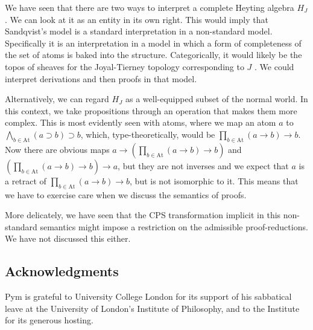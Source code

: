 \documentclass{sn-jnl}
\newcommand{\At}{\text{At}}
\begin{document}
We have seen that there are two ways to interpret a complete Heyting algebra $H_J$. We can look at it as an entity in its own right. This would imply that Sandqvist's model is a standard interpretation in a non-standard model. Specifically it is an interpretation in a model in which a form of completeness of the set of atoms is baked into the structure. Categorically, it would likely be the topos of sheaves for the Joyal-Tierney topology corresponding to $J$ \cite{MM1992}. We could interpret derivations and then proofs in that model. 

Alternatively, we can regard $H_J$ as a well-equipped subset of the normal world. In this context, we take propositions through an operation that makes them more complex. This is most evidently seen with atoms, where we map an atom $a$ to $\bigwedge_{b\in\At} (a\supset b)\supset b$, which, type-theoretically, would be
$\prod_{b\in\At} (a\to b)\to b$. Now there are obvious maps $a \longrightarrow (\prod_{b\in\At} (a\to b)\to b)$ and $(\prod_{b\in\At} (a\to b)\to b) \longrightarrow a$, but they are not inverses and we expect that $a$ is a retract of $\prod_{b\in\At} (a\to b)\to b$, but is not isomorphic to it. This means that we have to exercise care when we discuss the semantics of proofs. 

More delicately, we have seen that the CPS  transformation implicit in this non-standard semantics might impose a restriction on the admissible proof-reductions. We have not discussed this either. 

\subsection*{Acknowledgments} 

Pym is grateful to University College London for its
support of his sabbatical leave at the University of London’s Institute of Philosophy, and to the
Institute for its generous hosting. 

%


\end{document}
